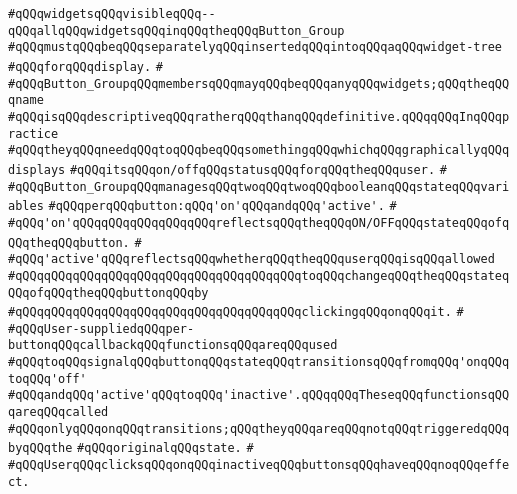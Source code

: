 \verb|#qQQqwidgetsqQQqvisibleqQQq--qQQqallqQQqwidgetsqQQqinqQQqtheqQQqButton_Group|\newline
\verb|#qQQqmustqQQqbeqQQqseparatelyqQQqinsertedqQQqintoqQQqaqQQqwidget-tree|\newline
\verb|#qQQqforqQQqdisplay.|\newline
\verb|#|\newline
\verb|#qQQqButton_GroupqQQqmembersqQQqmayqQQqbeqQQqanyqQQqwidgets;qQQqtheqQQqname|\newline
\verb|#qQQqisqQQqdescriptiveqQQqratherqQQqthanqQQqdefinitive.qQQqqQQqInqQQqpractice|\newline
\verb|#qQQqtheyqQQqneedqQQqtoqQQqbeqQQqsomethingqQQqwhichqQQqgraphicallyqQQqdisplays|\newline
\verb|#qQQqitsqQQqon/offqQQqstatusqQQqforqQQqtheqQQquser.|\newline
\verb|#|\newline
\verb|#qQQqButton_GroupqQQqmanagesqQQqtwoqQQqtwoqQQqbooleanqQQqstateqQQqvariables|\newline
\verb|#qQQqperqQQqbutton:qQQq'on'qQQqandqQQq'active'.|\newline
\verb|#|\newline
\verb|#qQQq'on'qQQqqQQqqQQqqQQqqQQqreflectsqQQqtheqQQqON/OFFqQQqstateqQQqofqQQqtheqQQqbutton.|\newline
\verb|#|\newline
\verb|#qQQq'active'qQQqreflectsqQQqwhetherqQQqtheqQQquserqQQqisqQQqallowed|\newline
\verb|#qQQqqQQqqQQqqQQqqQQqqQQqqQQqqQQqqQQqqQQqtoqQQqchangeqQQqtheqQQqstateqQQqofqQQqtheqQQqbuttonqQQqby|\newline
\verb|#qQQqqQQqqQQqqQQqqQQqqQQqqQQqqQQqqQQqqQQqclickingqQQqonqQQqit.|\newline
\verb|#|\newline
\verb|#qQQqUser-suppliedqQQqper-buttonqQQqcallbackqQQqfunctionsqQQqareqQQqused|\newline
\verb|#qQQqtoqQQqsignalqQQqbuttonqQQqstateqQQqtransitionsqQQqfromqQQq'onqQQqtoqQQq'off'|\newline
\verb|#qQQqandqQQq'active'qQQqtoqQQq'inactive'.qQQqqQQqTheseqQQqfunctionsqQQqareqQQqcalled|\newline
\verb|#qQQqonlyqQQqonqQQqtransitions;qQQqtheyqQQqareqQQqnotqQQqtriggeredqQQqbyqQQqthe|\newline
\verb|#qQQqoriginalqQQqstate.|\newline
\verb|#|\newline
\verb|#qQQqUserqQQqclicksqQQqonqQQqinactiveqQQqbuttonsqQQqhaveqQQqnoqQQqeffect.|\newline
